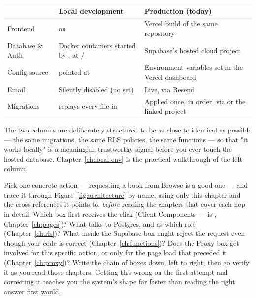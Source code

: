 \begin{center}
\begin{tabularx}{\textwidth}{@{}l Y Y@{}}
\toprule
& \textbf{Local development} & \textbf{Production (today)} \\
\midrule
Frontend &  on  & Vercel build of the same repository \\
Database \& Auth & Docker containers started by , at / & Supabase's hosted cloud project \\
Config source &  pointed at  & Environment variables set in the Vercel dashboard \\
Email & Silently disabled (no  set) & Live, via Resend \\
Migrations &  replays every file in  & Applied once, in order, via  or the linked project \\
\bottomrule
\end{tabularx}
\end{center}

The two columns are deliberately structured to be as close to identical as possible — the same migrations, the same RLS policies, the same functions — so that "it works locally" is a meaningful, trustworthy signal before you ever touch the hosted database. Chapter~\ref{ch:local-env} is the practical walkthrough of the left column.

\begin{olktask}
Pick one concrete action — requesting a book from Browse is a good one — and trace it through Figure~\ref{fig:architecture} by name, using only this chapter and the cross-references it points to, \emph{before} reading the chapters that cover each hop in detail. Which box first receives the click (Client Components —  is , Chapter~\ref{ch:pages})? What talks to Postgres, and as which role (Chapter~\ref{ch:rls})? What inside the Supabase box might reject the request even though your code is correct (Chapter~\ref{ch:functions})? Does the Proxy box get involved for this specific action, or only for the page load that preceded it (Chapter~\ref{ch:proxy})? Write the chain of boxes down, left to right, then go verify it as you read those chapters. Getting this wrong on the first attempt and correcting it teaches you the system's shape far faster than reading the right answer first would.
\end{olktask}
